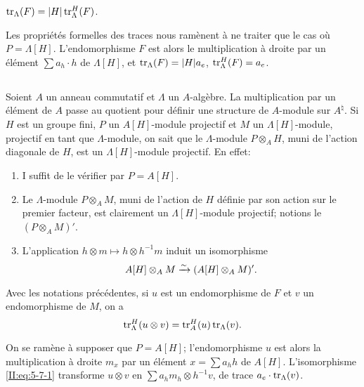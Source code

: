 \begin{proposition_}\label{II:5-6}
$\operatorname{tr}_\Lambda(F) = |H|\operatorname{tr}_\Lambda^H(F)$. 
\end{proposition_}

Les propri\'et\'es formelles des traces nous ram\`enent \`a ne traiter que le 
cas o\`u $P=\Lambda[H]$. L'endomorphisme $F$ est alors le multiplication \`a 
droite par un \'el\'ement $\sum a_h\cdot h$ de $\Lambda[H]$, et 
$\operatorname{tr}_\Lambda(F) = |H| a_e$, $\operatorname{tr}_\Lambda^H(F) = a_e$. 





\subsection{}\label{II:5-7}

Soient $A$ un anneau commutatif et $\Lambda$ un $A$-alg\`ebre. La multiplication 
par un \'el\'ement de $A$ passe au quotient pour d\'efinir une structure de 
$A$-module sur $A^\natural$. Si $H$ est un groupe fini, $P$ un $A[H]$-module 
projectif et $M$ un $\Lambda[H]$-module, projectif en tant que $\Lambda$-module, 
on sait que le $\Lambda$-module $P\otimes_A H$, muni de l'action diagonale de 
$H$, est un $\Lambda[H]$-module projectif. En effet: 
\begin{enumerate}[\indent a)]
  \item I suffit de le v\'erifier par $P=A[H]$. 
  \item Le $\Lambda$-module $P\otimes_A M$, muni de l'action de $H$ d\'efinie 
    par son action sur le premier facteur, est clairement un 
    $\Lambda[H]$-module projectif; notions le $(P\otimes_A M)'$. 
  \item L'application $h\otimes m\mapsto h\otimes h^{-1} m$ induit un 
    isomorphisme 
    \begin{equation}\label{II:eq:5-7-1}
      A[H]\otimes_A M \xrightarrow\sim (A[H]\otimes_A M)' \text{.}
    \end{equation}
\end{enumerate}





\begin{proposition_}\label{II:5-8}
Avec les notations pr\'ec\'edentes, si $u$ est un endomorphisme de $F$ et 
$v$ un endomorphisme de $M$, on a 
\[
  \operatorname{tr}_\Lambda^H(u\otimes v) = \operatorname{tr}_A^H(u)\operatorname{tr}_\Lambda(v) \text{.}
\]
\end{proposition_}

On se ram\`ene \`a supposer que $P=A[H]$; l'endomorphisme $u$ est alors la 
multiplication \`a droite $m_x$ par un \'el\'ement $x=\sum a_h h$ de $A[H]$. 
L'isomorphisme \eqref{II:eq:5-7-1} transforme $u\otimes v$ en 
$\sum a_h m_h\otimes h^{-1} v$, de trace $a_e\cdot\operatorname{tr}_\Lambda(v)$. 





